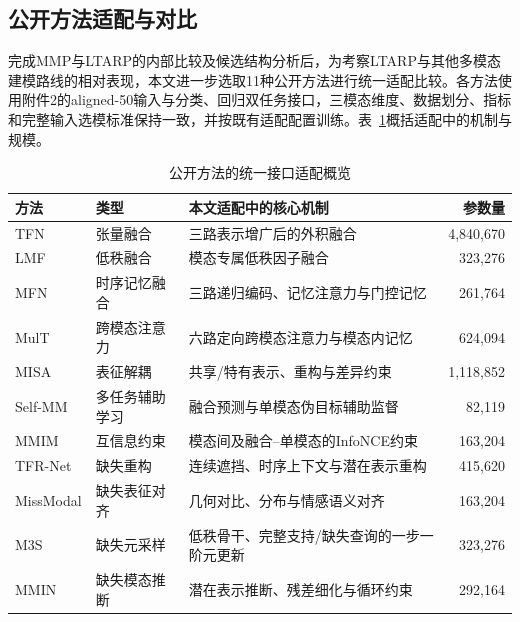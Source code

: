\begin{table}[!htbp]
\centering{}\setlength{\tabcolsep}{4pt}
\begin{minipage}{\textwidth}\songti\normalsize
\subsection{公开方法适配与对比}\label{subsec:q2_public}
\QTwoParagraph 完成MMP与LTARP的内部比较及候选结构分析后，为考察LTARP与其他多模态建模路线的相对表现，本文进一步选取11种公开方法进行统一适配比较。各方法使用附件2的aligned-50输入与分类、回归双任务接口，三模态维度、数据划分、指标和完整输入选模标准保持一致，并按既有适配配置训练。表~\ref{tab:q2_public_overview}概括适配中的机制与规模。
\end{minipage}\par\vspace{10bp}
\caption{公开方法的统一接口适配概览}\label{tab:q2_public_overview}
\begin{tabularx}{.98\textwidth}{@{}>{\raggedright\arraybackslash}p{}>{\raggedright\arraybackslash}p{}>{\raggedright\arraybackslash}X r@{}}
\toprule
方法 & 类型 & 本文适配中的核心机制 & 参数量\\
\midrule
TFN\cite{q2tfn} & 张量融合 & 三路表示增广后的外积融合 & 4,840,670\\
LMF\cite{q2lmf} & 低秩融合 & 模态专属低秩因子融合 & 323,276\\
MFN\cite{q2mfn} & 时序记忆融合 & 三路递归编码、记忆注意力与门控记忆 & 261,764\\
MulT\cite{q2mult} & 跨模态注意力 & 六路定向跨模态注意力与模态内记忆 & 624,094\\
MISA\cite{q2misa} & 表征解耦 & 共享/特有表示、重构与差异约束 & 1,118,852\\
Self-MM\cite{q2selfmm} & 多任务辅助学习 & 融合预测与单模态伪目标辅助监督 & 82,119\\
MMIM\cite{q2mmim} & 互信息约束 & 模态间及融合--单模态的InfoNCE约束 & 163,204\\
\addlinespace
TFR-Net\cite{q2tfr} & 缺失重构 & 连续遮挡、时序上下文与潜在表示重构 & 415,620\\
MissModal\cite{q2missmodal} & 缺失表征对齐 & 几何对比、分布与情感语义对齐 & 163,204\\
M3S\cite{q2m3s} & 缺失元采样 & 低秩骨干、完整支持/缺失查询的一步一阶元更新 & 323,276\\
MMIN\cite{q2mmin} & 缺失模态推断 & 潜在表示推断、残差细化与循环约束 & 292,164\\
\bottomrule
\end{tabularx}
\par\vspace{10bp}\begin{minipage}{\textwidth}\songti\normalsize

\end{minipage}
\end{table}
